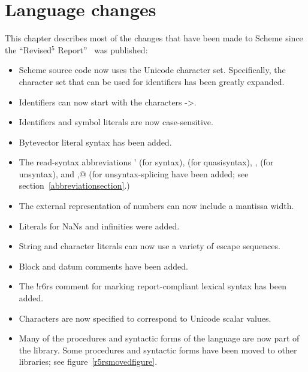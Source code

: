 \chapter{Language changes}
\label{languagechangesappendix}

This chapter describes most of the changes that have been made to
Scheme since the ``Revised$^5$ Report''~\cite{R5RS} was published:

\begin{itemize}
\item Scheme source code now uses the Unicode character set.
  Specifically, the character set that can be used for identifiers has
  been greatly expanded.
\item Identifiers can now start with the characters {\cf ->}.
\item Identifiers and symbol literals are now case-sensitive.
\item Bytevector literal syntax has been added.
\item The read-syntax abbreviations {\cf \sharpsign{}'} (for {\cf
    syntax}), {\cf \sharpsign\backquote} (for {\cf quasisyntax}), {\cf
    \sharpsign{},} (for {\cf unsyntax}), and {\cf \sharpsign{},@}
  (for {\cf unsyntax-splicing} have been added; see section~\ref{abbreviationsection}.)
\item The external representation of numbers can now include a
  mantissa width.
\item Literals for NaNs and infinities were added.
\item String and character literals can now use a variety of escape
  sequences.
\item Block and datum comments have been added.
\item The {\cf !\sharpsign{}r6rs} comment for marking report-compliant
  lexical syntax has been added.
\item Characters are now specified to correspond to Unicode scalar
  values.
\item Many of the procedures and syntactic forms of the language are
  now part of the  library.  Some procedures and
  syntactic forms have been moved to other libraries; see figure~\ref{r5rsmovedfigure}.


\end{itemize}
